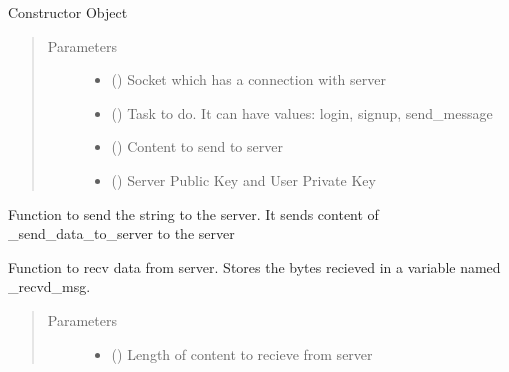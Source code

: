 \documentclass[letterpaper,10pt,english]{sphinxmanual}
\begin{document}
\begin{fulllineitems}
Constructor Object
\begin{quote}\begin{description}
\item[{Parameters}] \leavevmode\begin{itemize}
\item {} 
 () \textendash{} Socket which has a connection with server

\item {} 
 () \textendash{} Task to do. It can have values: login, signup, send\_message

\item {} 
 () \textendash{} Content to send to server

\item {} 
 () \textendash{} Server Public Key and User Private Key

\end{itemize}

\end{description}\end{quote}

\begin{fulllineitems}
\label{\detokenize{Message:Message.Message._send_data_to_server}}
Function to send the string to the server. It sends content of \_send\_data\_to\_server to the server

\end{fulllineitems}


\begin{fulllineitems}
\label{\detokenize{Message:Message.Message._recv_data_from_server}}
Function to recv data from server. Stores the bytes recieved in a variable named \_recvd\_msg.
\begin{quote}\begin{description}
\item[{Parameters}] \leavevmode\begin{itemize}
\item {} 
 () \textendash{} Length of content to recieve from server


\end{itemize}
\end{description}
\end{quote}
\end{fulllineitems}
\end{fulllineitems}
\end{document}
